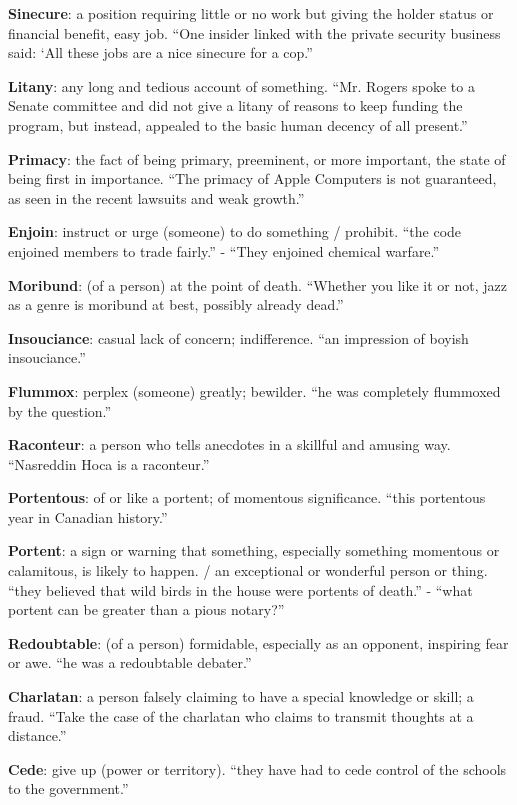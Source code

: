 \documentclass[12pt, a4paper]{ximera}
\begin{document}
\textbf{Sinecure}: a position requiring little or no work but giving the holder status or financial benefit, easy job. ``One insider linked with the private security business said: ‘All these jobs are a nice sinecure for a cop.''

\textbf{Litany}: any long and tedious account of something. ``Mr. Rogers spoke to a Senate committee and did not give a litany of reasons to keep funding the program, but instead, appealed to the basic human decency of all present.''

\textbf{Primacy}: the fact of being primary, preeminent, or more important, the state of being first in importance. ``The primacy of Apple Computers is not guaranteed, as seen in the recent lawsuits and weak growth.''

\textbf{Enjoin}: instruct or urge (someone) to do something / prohibit. ``the code enjoined members to trade fairly.'' - ``They enjoined chemical warfare.''

\textbf{Moribund}: (of a person) at the point of death. ``Whether you like it or not, jazz as a genre is moribund at best, possibly already dead.''

\textbf{Insouciance}: casual lack of concern; indifference. ``an impression of boyish insouciance.''

\textbf{Flummox}: perplex (someone) greatly; bewilder. ``he was completely flummoxed by the question.''

\textbf{Raconteur}: a person who tells anecdotes in a skillful and amusing way. ``Nasreddin Hoca is a raconteur.''

\textbf{Portentous}: of or like a portent; of momentous significance. ``this portentous year in Canadian history.''

\textbf{Portent}: a sign or warning that something, especially something momentous or calamitous, is likely to happen. / an exceptional or wonderful person or thing. ``they believed that wild birds in the house were portents of death.'' - ``what portent can be greater than a pious notary?''

\textbf{Redoubtable}: (of a person) formidable, especially as an opponent, inspiring fear or awe. ``he was a redoubtable debater.''

\textbf{Charlatan}: a person falsely claiming to have a special knowledge or skill; a fraud. ``Take the case of the charlatan who claims to transmit thoughts at a distance.''

\textbf{Cede}: give up (power or territory). ``they have had to cede control of the schools to the government.''
\end{document}
